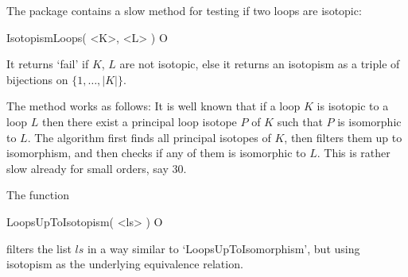 The package contains a slow method for testing if two loops are isotopic:

\>IsotopismLoops( <K>, <L> ) O

It returns `fail' if $K$, $L$ are not isotopic, else it returns an isotopism as
a triple of bijections on $\{1,\dots,|K|\}$.

The method works as follows: It is well known that if a loop $K$ is isotopic to
a loop $L$ then there exist a principal loop isotope $P$ of $K$ such that $P$
is isomorphic to $L$. The algorithm first finds all principal isotopes of $K$,
then filters them up to isomorphism, and then checks if any of them is
isomorphic to $L$. This is rather slow already for small orders, say $30$.

The function

\>LoopsUpToIsotopism( <ls> ) O

filters the list $ls$ in a way similar to `LoopsUpToIsomorphism', but using
isotopism as the underlying equivalence relation.
